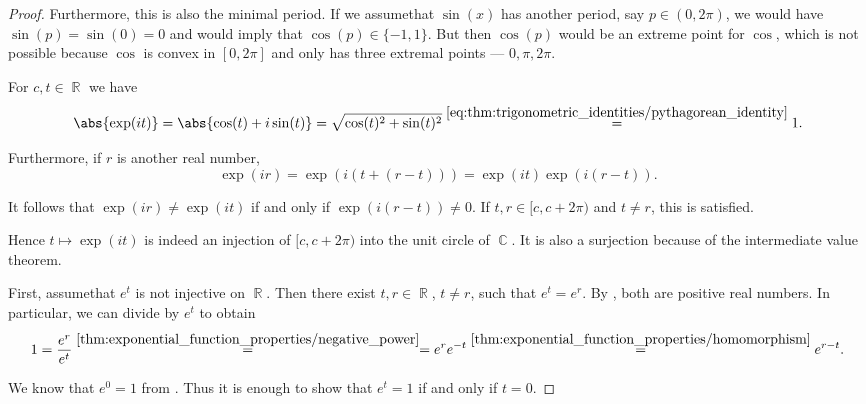 \begin{proof}
  Furthermore, this is also the minimal period. If we assume\DNE that \( \sin(x) \) has another period, say \( p \in (0, 2\pi) \), we would have \( \sin(p) = \sin(0) = 0 \) and  would imply that \( \cos(p) \in \{ -1, 1 \} \). But then \( \cos(p) \) would be an extreme point for \( \cos \), which is not possible because \( \cos \) is convex in \( [0, 2\pi] \) and only has three extremal points --- \( 0, \pi, 2\pi \).

   For \( c, t \in \BbbR \) we have
  \begin{equation*}
    \abs{\exp(it)}
    =
    \abs{\cos(t) + i\sin(t)}
    =
    \sqrt{\cos(t)^2 + \sin(t)^2}
    \overset {\eqref{eq:thm:trigonometric_identities/pythagorean_identity}} =
    1.
  \end{equation*}

  Furthermore, if \( r \) is another real number,
  \begin{equation}
    \exp(ir)
    =
    \exp(i(t + (r - t)))
    =
    \exp(it) \exp(i(r - t)).
  \end{equation}

  It follows that \( \exp(ir) \neq \exp(it) \) if and only if \( \exp(i(r - t)) \neq 0 \). If \( t, r \in [c, c + 2\pi) \) and \( t \neq r \), this is satisfied.

  Hence \( t \mapsto \exp(it) \) is indeed an injection of \( [c, c + 2\pi) \) into the unit circle of \( \BbbC \). It is also a surjection because of the intermediate value theorem.

   First, assume\DNE that \( e^t \) is not injective on \( \BbbR \). Then there exist \( t, r \in \BbbR \), \( t \neq r \), such that \( e^t = e^r \). By , both are positive real numbers. In particular, we can divide by \( e^t \) to obtain
  \begin{equation*}
    1
    =
    \frac {e^r} {e^t}
    \overset {\ref{thm:exponential_function_properties/negative_power}} =
    =
    e^r e^{-t}
    \overset {\ref{thm:exponential_function_properties/homomorphism}} =
    e^{r - t}.
  \end{equation*}

  We know that \( e^0 = 1 \) from . Thus it is enough to show that \( e^t = 1 \) if and only if \( t = 0 \).


\end{proof}

